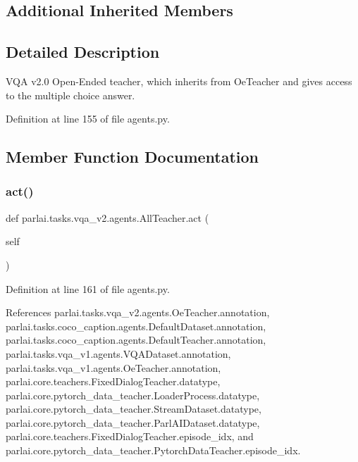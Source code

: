 \subsection*{Additional Inherited Members}


\subsection{Detailed Description}
\begin{DoxyVerb}VQA v2.0 Open-Ended teacher, which inherits from OeTeacher and
gives access to the multiple choice answer.
\end{DoxyVerb}
 

Definition at line 155 of file agents.\+py.



\subsection{Member Function Documentation}
\mbox{\label{classparlai_1_1tasks_1_1vqa__v2_1_1agents_1_1AllTeacher_a4a97c6641e40361ef66c5c6084eaebea}} 
\subsubsection{\texorpdfstring{act()}{act()}}
{\footnotesize\ttfamily def parlai.\+tasks.\+vqa\+\_\+v2.\+agents.\+All\+Teacher.\+act (\begin{DoxyParamCaption}\item[{}]{self }\end{DoxyParamCaption})}



Definition at line 161 of file agents.\+py.



References parlai.\+tasks.\+vqa\+\_\+v2.\+agents.\+Oe\+Teacher.\+annotation, parlai.\+tasks.\+coco\+\_\+caption.\+agents.\+Default\+Dataset.\+annotation, parlai.\+tasks.\+coco\+\_\+caption.\+agents.\+Default\+Teacher.\+annotation, parlai.\+tasks.\+vqa\+\_\+v1.\+agents.\+V\+Q\+A\+Dataset.\+annotation, parlai.\+tasks.\+vqa\+\_\+v1.\+agents.\+Oe\+Teacher.\+annotation, parlai.\+core.\+teachers.\+Fixed\+Dialog\+Teacher.\+datatype, parlai.\+core.\+pytorch\+\_\+data\+\_\+teacher.\+Loader\+Process.\+datatype, parlai.\+core.\+pytorch\+\_\+data\+\_\+teacher.\+Stream\+Dataset.\+datatype, parlai.\+core.\+pytorch\+\_\+data\+\_\+teacher.\+Parl\+A\+I\+Dataset.\+datatype, parlai.\+core.\+teachers.\+Fixed\+Dialog\+Teacher.\+episode\+\_\+idx, and parlai.\+core.\+pytorch\+\_\+data\+\_\+teacher.\+Pytorch\+Data\+Teacher.\+episode\+\_\+idx.



